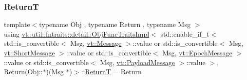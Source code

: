 \subsubsection{\texorpdfstring{ReturnT}{ReturnT}}
{\footnotesize\ttfamily template$<$typename Obj , typename Return , typename Msg $>$ \\
using \hyperlink{structvt_1_1util_1_1fntraits_1_1detail_1_1_obj_func_traits_impl}{vt\+::util\+::fntraits\+::detail\+::\+Obj\+Func\+Traits\+Impl}$<$ std\+::enable\+\_\+if\+\_\+t$<$ std\+::is\+\_\+convertible$<$ Msg, \hyperlink{namespacevt_a3a3ddfef40b4c90915fa43cdd5f129ea}{vt\+::\+Message} $>$\+::value or std\+::is\+\_\+convertible$<$ Msg, \hyperlink{namespacevt_a1125ac1da6c0bbf141e0ea0739d7602d}{vt\+::\+Short\+Message} $>$\+::value or std\+::is\+\_\+convertible$<$ Msg, \hyperlink{namespacevt_ad67368ffae52d7325002586b41bb150e}{vt\+::\+Epoch\+Message} $>$\+::value or std\+::is\+\_\+convertible$<$ Msg, \hyperlink{namespacevt_a89a92229c5622b855c02c549f83a1a68}{vt\+::\+Payload\+Message} $>$\+::value $>$, Return(Obj\+::$\ast$)(Msg $\ast$)$>$\+::\hyperlink{structvt_1_1util_1_1fntraits_1_1detail_1_1_obj_func_traits_impl_3_01std_1_1enable__if__t_3_01std50180eda0449a3437a18b4857773a769_a69f2ec9b28dae0886f5622cdcb9c0b10}{ReturnT} =  Return}




